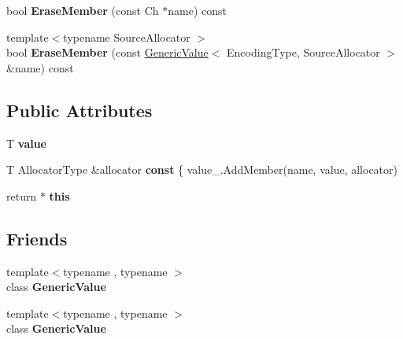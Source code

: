 \begin{DoxyCompactItemize}
\item 
bool {\bfseries Erase\+Member} (const Ch $\ast$name) const \hypertarget{class_generic_object_abcf63f10bbc634620e03bf8b375fa6fd}{}\label{class_generic_object_abcf63f10bbc634620e03bf8b375fa6fd}

\item 
{\footnotesize template$<$typename Source\+Allocator $>$ }\\bool {\bfseries Erase\+Member} (const \hyperlink{class_generic_value}{Generic\+Value}$<$ Encoding\+Type, Source\+Allocator $>$ \&name) const \hypertarget{class_generic_object_afda9d121d16de8b70f7bf09621851218}{}\label{class_generic_object_afda9d121d16de8b70f7bf09621851218}

\end{DoxyCompactItemize}
\subsection*{Public Attributes}
\begin{DoxyCompactItemize}
\item 
T {\bfseries value}\hypertarget{class_generic_object_a131538fbbacbc0a3a5ad15dbea66394f}{}\label{class_generic_object_a131538fbbacbc0a3a5ad15dbea66394f}

\item 
T Allocator\+Type \&allocator {\bfseries const} \{ value\+\_\+.\+Add\+Member(name, value, allocator)\hypertarget{class_generic_object_af70c9646b5e422306c33e98b3d8783a7}{}\label{class_generic_object_af70c9646b5e422306c33e98b3d8783a7}

\item 
return $\ast$ {\bfseries this}\hypertarget{class_generic_object_a719a0e5501da825e6f86ce12b46446cb}{}\label{class_generic_object_a719a0e5501da825e6f86ce12b46446cb}

\end{DoxyCompactItemize}
\subsection*{Friends}
\begin{DoxyCompactItemize}
\item 
{\footnotesize template$<$typename , typename $>$ }\\class {\bfseries Generic\+Value}\hypertarget{class_generic_object_a899449e1a645b5e377af059fb61113d8}{}\label{class_generic_object_a899449e1a645b5e377af059fb61113d8}

\item 
{\footnotesize template$<$typename , typename $>$ }\\class {\bfseries Generic\+Value}\hypertarget{class_generic_object_ae85bda3be5ddb0ad7b3dc29984467ac2}{}\label{class_generic_object_ae85bda3be5ddb0ad7b3dc29984467ac2}

\end{DoxyCompactItemize}


